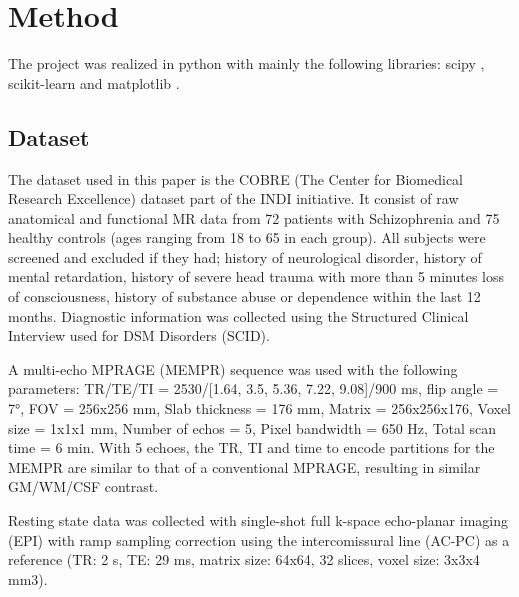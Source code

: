 \documentclass[12pt,journal,compsoc]{IEEEtran}
\begin{document}


\section{Method}
The project was realized in python with mainly the following libraries: scipy \cite{scipy}, scikit-learn \cite{scikitlearn} and matplotlib \cite{matplotlib}.

\subsection{Dataset}
The dataset used in this paper is the COBRE (The Center for Biomedical Research Excellence) dataset part of the INDI initiative. It consist of raw anatomical and functional MR data from 72 patients with Schizophrenia and 75 healthy controls (ages ranging from 18 to 65 in each group). All subjects were screened and excluded if they had; history of neurological disorder, history of mental retardation, history of severe head trauma with more than 5 minutes loss of consciousness, history of substance abuse or dependence within the last 12 months. Diagnostic information was collected using the Structured Clinical Interview used for DSM Disorders (SCID).

A multi-echo MPRAGE (MEMPR) sequence was used with the following parameters: TR/TE/TI = 2530/[1.64, 3.5, 5.36, 7.22, 9.08]/900 ms, flip angle = 7°, FOV = 256x256 mm, Slab thickness = 176 mm, Matrix = 256x256x176, Voxel size = 1x1x1 mm, Number of echos = 5, Pixel bandwidth = 650 Hz, Total scan time = 6 min. With 5 echoes, the TR, TI and time to encode partitions for the MEMPR are similar to that of a conventional MPRAGE, resulting in similar GM/WM/CSF contrast.

Resting state data was collected with single-shot full k-space echo-planar imaging (EPI) with ramp sampling correction using the intercomissural line (AC-PC) as a reference (TR: 2 s, TE: 29 ms, matrix size: 64x64, 32 slices, voxel size: 3x3x4 mm3).
\end{document}
